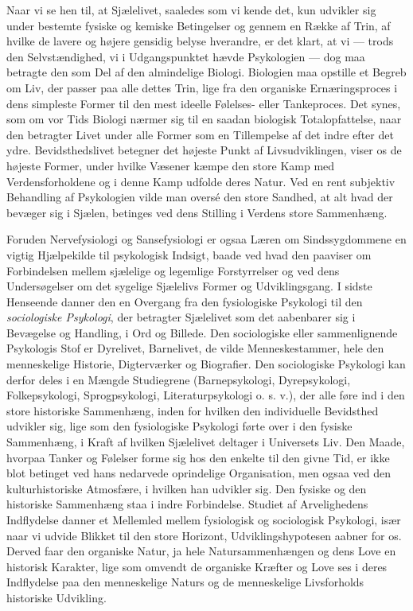 \documentclass[12pt,a4paper,openany]{book}
\newcommand{\opage}[1]{\marginnote{\footnotesize\textit{[#1]}}}
\begin{document}
Naar vi se hen til, at Sjælelivet, saaledes som vi kende det, kun
udvikler sig under bestemte fysiske og kemiske Betingelser og gennem en
Række af Trin, af hvilke de lavere og højere gensidig belyse hverandre,
er det klart, at vi --- trods den Selvstændighed, vi i Udgangspunktet
hævde Psykologien --- dog maa betragte den som Del af den almindelige
Biologi. Biologien maa opstille et Begreb om Liv, der passer paa alle
dettes Trin, lige fra den organiske Ernæringsproces i dens simpleste
Former til den mest ideelle Følelses- eller Tankeproces. Det synes, som
om vor Tids Biologi nærmer sig til en saadan biologisk Totalopfattelse,
naar den betragter Livet under alle Former som en Tillempelse af det
indre efter det ydre. Bevidsthedslivet betegner det højeste Punkt af
Livsudviklingen, viser os de højeste Former, under hvilke Væsener kæmpe
den store Kamp med Verdensforholdene og i denne Kamp udfolde deres
Natur. Ved en rent subjektiv Behandling af Psykologien vilde man oversé
den store Sandhed, at alt hvad der bevæger sig i Sjælen, betinges ved
dens Stilling i Verdens store Sammenhæng.

Foruden Nervefysiologi og Sansefysiologi er ogsaa Læren om
Sindssygdommene en vigtig Hjælpekilde til psykologisk Indsigt, baade ved
hvad den paaviser om Forbindelsen mellem sjælelige og legemlige
Forstyrrelser og ved dens Undersøgelser om det sygelige Sjælelivs Former
og Udviklingsgang. I sidste Henseende danner den en Overgang fra den
fysiologiske Psykologi til den \emph{sociologiske Psykologi}, der
betragter Sjælelivet som det aabenbarer sig i Bevægelse og Handling, i
Ord og Billede. Den sociologiske eller sammenlignende Psykologis Stof er
Dyrelivet, Barnelivet, de vilde Menneskestammer, hele
\opage{32}den menneskelige Historie, Digterværker og Biografier. Den
sociologiske Psykologi kan derfor deles i en Mængde Studiegrene
(Barnepsykologi, Dyrepsykologi, Folkepsykologi, Sprogpsykologi,
Literaturpsykologi o. s. v.), der alle føre ind i den store historiske
Sammenhæng, inden for hvilken den individuelle Bevidsthed udvikler sig,
lige som den fysiologiske Psykologi førte over i den fysiske Sammenhæng,
i Kraft af hvilken Sjælelivet deltager i Universets Liv. Den Maade,
hvorpaa Tanker og Følelser forme sig hos den enkelte til den givne Tid,
er ikke blot betinget ved hans nedarvede oprindelige Organisation, men
ogsaa ved den kulturhistoriske Atmosfære, i hvilken han udvikler sig.
Den fysiske og den historiske Sammenhæng staa i indre Forbindelse.
Studiet af Arvelighedens Indflydelse danner et Mellemled mellem
fysiologisk og sociologisk Psykologi, især naar vi udvide Blikket til
den store Horizont, Udviklingshypotesen aabner for os. Derved faar den
organiske Natur, ja hele Natursammenhængen og dens Love en historisk
Karakter, lige som omvendt de organiske Kræfter og Love ses i deres
Indflydelse paa den menneskelige Naturs og de menneskelige Livsforholds
historiske Udvikling.
\end{document}
